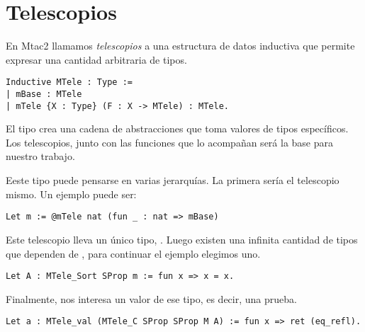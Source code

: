 \section{Telescopios}

En Mtac2 llamamos \textit{telescopios} a una estructura de datos inductiva
que permite expresar una cantidad arbitraria de tipos.

\begin{verbatim}
Inductive MTele : Type :=
| mBase : MTele
| mTele {X : Type} (F : X -> MTele) : MTele.
\end{verbatim}

El tipo  crea una cadena de abstracciones que toma valores de tipos
específicos.
Los telescopios, junto con las funciones que lo acompañan será la base para nuestro
trabajo.

Eeste tipo puede pensarse en varias jerarquías.
La primera sería el telescopio mismo.
Un ejemplo puede ser:

\begin{verbatim}
Let m := @mTele nat (fun _ : nat => mBase)
\end{verbatim}

Este telescopio lleva un único tipo, .
Luego existen una infinita cantidad de tipos que dependen de , para
continuar el ejemplo elegimos uno.

\begin{verbatim}
Let A : MTele_Sort SProp m := fun x => x = x.
\end{verbatim}

Finalmente, nos interesa un valor de ese tipo, es decir, una prueba.

\begin{verbatim}
Let a : MTele_val (MTele_C SProp SProp M A) := fun x => ret (eq_refl).
\end{verbatim}
